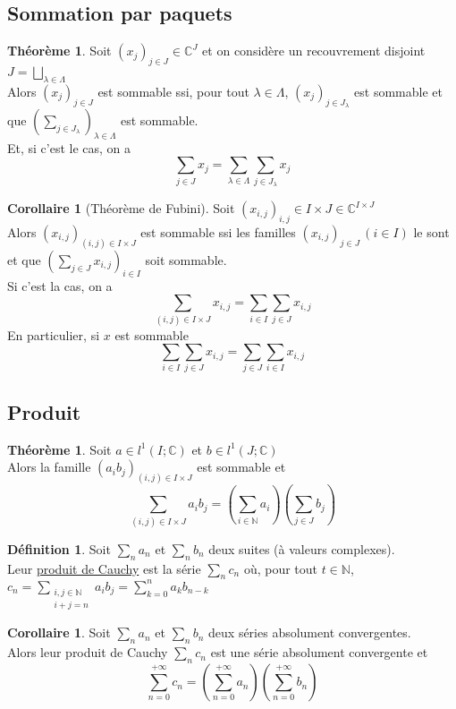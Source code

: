 \documentclass[10pt,a4paper]{article}
\theoremstyle{definition}
\newtheorem{theorem}[proposition]{Théorème}
\newtheorem{corollaire}[proposition]{Corollaire}
\newtheorem{definition}[proposition]{Définition}
\begin{document}
\subsection{Sommation par paquets}
\begin{theorem}
Soit $(x_j)_{j \in J} \in \mathbb{C}^J$ et on considère un recouvrement disjoint $J = \bigsqcup\limits_{\lambda \in \Lambda}$ \\
Alors $(x_j)_{j \in J}$ est sommable ssi, pour tout $\lambda \in \Lambda$, $(x_j)_{j \in J_\lambda}$ est sommable et que $(\sum\limits_{j \in J_\lambda})_{\lambda \in \Lambda}$ est sommable. \\
Et, si c'est le cas, on a
\[ \sum_{j \in J} x_j = \sum_{\lambda \in \Lambda} \sum_{j \in J_\lambda} x_j\]
\end{theorem}
\begin{corollaire}[Théorème de Fubini]
Soit $(x_{i, j})_{i, j} \in I \times J \in \mathbb{C}^{I \times J}$ \\
Alors $(x_{i, j})_{(i, j) \in I \times J}$ est sommable ssi les familles $(x_{i, j})_{j \in J} \, (i \in I)$ le sont et que $(\sum\limits_{j \in J} x_{i, j})_{i \in I}$ soit sommable. \\
Si c'est la cas, on a
\[\sum_{(i, j) \in I \times J} x_{i, j} = \sum_{i \in I} \sum_{j \in J} x_{i, j}\]
En particulier, si $x$ est sommable
\[ \sum_{i \in I} \sum_{j \in J} x_{i, j} = \sum_{j \in J} \sum_{i \in I} x_{i, j}\]
\end{corollaire}

\subsection{Produit}
\begin{theorem}
Soit $a \in l^1(I; \mathbb{C})$ et $b \in l^1(J; \mathbb{C})$ \\
Alors la famille $(a_i b_j)_{(i, j) \in I \times J}$ est sommable et
\[\sum_{(i, j) \in I \times J} a_i b_j = \left(\sum_{i \in \mathbb{N}} a_i \right) \left(\sum_{j \in J} b_j\right)\]
\end{theorem}
\begin{definition}
Soit $\sum\limits_n a_n$ et $\sum\limits_n b_n$ deux suites (à valeurs complexes). \\
Leur \uline{produit de Cauchy} est la série $\sum\limits_n c_n$ où, pour tout $t \in \mathbb{N}$, $c_n = \sum\limits_{\substack{i, j \in \mathbb{N} \\ i + j = n}} a_i b_j = \sum\limits_{k = 0}^n a_k b_{n - k}$
\end{definition}
\begin{corollaire}
Soit $\sum\limits_n a_n$ et $\sum\limits_n b_n$ deux séries absolument convergentes. \\
Alors leur produit de Cauchy $\sum\limits_n c_n$ est une série absolument convergente et
\[\sum_{n = 0}^{+\infty} c_n = \left( \sum_{n = 0}^{+\infty} a_n \right) \left( \sum_{n = 0}^{+\infty} b_n \right)\]
\end{corollaire}
\end{document}

